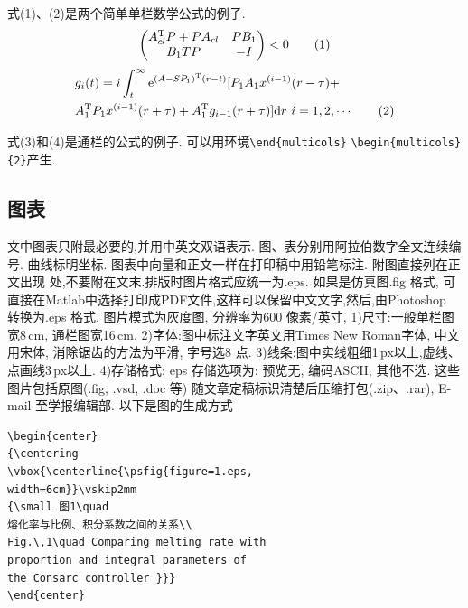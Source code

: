 \documentclass{Style/aas}
\begin{document}
\begin{multicols}{2}
  式(1)、(2)是两个简单单栏数学公式的例子.
  \begin{equation}
    \begin{pmatrix}
      A_{cl}^{\rm T}P+PA_{cl} & PB_1 \\
      B_1TP                   & -I
    \end{pmatrix}
    <0 \tag{1}
  \end{equation}
  \allowdisplaybreaks
  \begin{align}
     & {\sl g}_i(t)=i\int_t^\infty {\rm e}^{(A-SP_1)^{\rm T}(r-t)}[P_1A_1
    x^{(i-1)}(r-\tau)+
    \nonumber                                                             \\
     & A_1^{\rm T}P_1 x^{(i-1)}(r+\tau)+A_1^ {\rm T}{\sl
    g}_{i-1}(r+\tau)]{\rm d}r\ i=1,2,\cdots \tag{2}
  \end{align}


  式(3)和(4)是通栏的公式的例子.
  可以用环境\verb|\end{multicols}| \verb|\begin{multicols}{2}|产生.

  \subsection{图表}



  文中图表只附最必要的,并用中英文双语表示.
  图、表分别用阿拉伯数字全文连续编号. 曲线标明坐标.
  图表中向量和正文一样在打印稿中用铅笔标注. 附图直接列在正文出现
  处,不要附在文末.排版时图片格式应统一为.eps. 如果是仿真图.fig 格式,
  可直接在Matlab中选择打印成PDF文件,这样可以保留中文文字,然后,由Photoshop 转换为.eps 格式.
  图片模式为灰度图, 分辨率为600 像素/英寸, 1)尺寸:一般单栏图宽8\,cm, 通栏图宽16\,cm. 2)字体:图中标注文字英文用Times New Roman字体,
  中文用宋体, 消除锯齿的方法为平滑, 字号选8 点. 3)线条:图中实线粗细1\,px以上,虚线、点画线3\,px以上.
  4)存储格式: eps 存储选项为: 预览无, 编码ASCII, 其他不选.
  这些图片包括原图(.fig, .vsd, .doc 等) 随文章定稿标识清楚后压缩打包(.zip、.rar), E-mail 至学报编辑部. 以下是图的生成方式
  \begin{verbatim}
\begin{center}
{\centering
\vbox{\centerline{\psfig{figure=1.eps,
width=6cm}}\vskip2mm
{\small 图1\quad
熔化率与比例、积分系数之间的关系\\
Fig.\,1\quad Comparing melting rate with
proportion and integral parameters of
the Consarc controller }}}
\end{center}
\end{verbatim}








\end{multicols}
\end{document}
